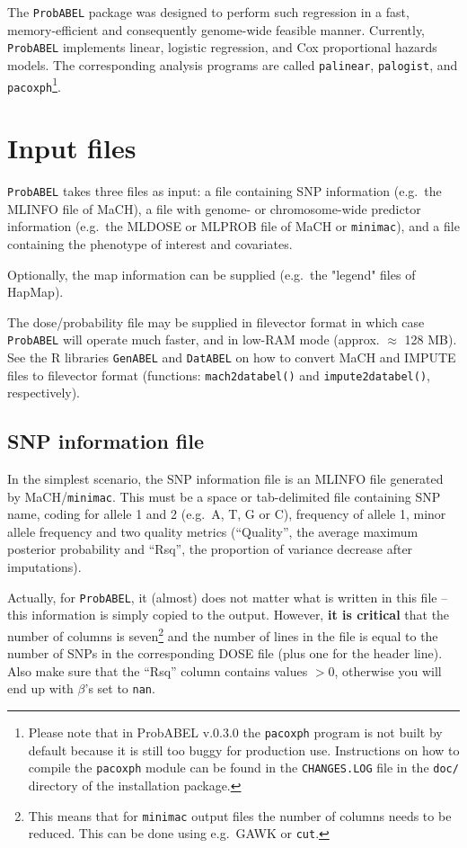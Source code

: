 \documentclass[12pt,a4paper]{article}
\newcommand{\PA}{\texttt{ProbABEL}}
\newcommand{\GA}{\texttt{GenABEL}}
\newcommand{\DA}{\texttt{DatABEL}}
\begin{document}
The \PA{} package was designed to perform such regression
in a fast, memory-efficient and consequently genome-wide feasible manner.
Currently, \PA{} implements linear, logistic regression,
and Cox proportional hazards models. The corresponding analysis
programs are called \texttt{palinear},  \texttt{palogist},
and \texttt{pacoxph}\footnote{Please note that in ProbABEL v.0.3.0 the
  \texttt{pacoxph} program is not built by default because it is still
too buggy for production use. Instructions on how to compile the
\texttt{pacoxph} module can be found in the \texttt{CHANGES.LOG} file
in the \texttt{doc/} directory of the installation package.}.


\section{Input files}
\PA{} takes three files as input: a file containing SNP
information (e.g.~the MLINFO file of MaCH), a file with genome- or
chromosome-wide predictor information (e.g.~the MLDOSE or MLPROB file
of MaCH or \texttt{minimac}),
and a file containing the phenotype of interest and covariates.

Optionally, the map information can be supplied (e.g.~the "legend"
files of HapMap).

The dose/probability file may be supplied in filevector format
in which case \PA{} will operate much faster, and
in low-RAM mode (approx. $\approx$ 128 MB). See the R libraries \GA{} and
\DA{} on how to convert MaCH and IMPUTE files to
filevector format (functions: \texttt{mach2databel()} and
\texttt{impute2databel()}, respectively).

\subsection{SNP information file}
\label{ssec:infoin}
In the simplest scenario, the SNP information file is an MLINFO
file generated by MaCH/\texttt{minimac}. This must be a space or tab-delimited file
containing SNP name, coding for allele 1 and 2 (e.g.~A, T, G or C),
frequency of allele 1, minor allele frequency and two quality
metrics (``Quality'', the average maximum posterior probability and
``Rsq'', the proportion of variance decrease after imputations).

Actually, for \PA{}, it (almost) does not matter what is written in
this file -- this information is simply copied to the output. However,
\textbf{it is critical} that the number of columns is
seven\footnote{This means that for \texttt{minimac} output files the number of
  columns needs to be reduced. This can be done using e.g.~GAWK or
  \texttt{cut}.} and the number of lines in the file is equal to the
number of SNPs in the corresponding DOSE file (plus one for the header
line). Also make sure that the ``Rsq'' column contains values $>0$,
otherwise you will end up with $\beta$'s set to \texttt{nan}.
\end{document}
